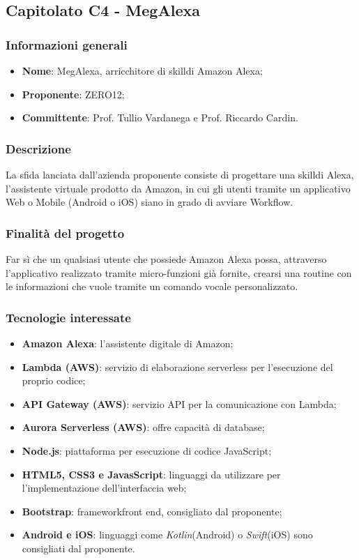 \subsection{Capitolato C4 - MegAlexa}
\subsubsection{Informazioni generali}
\begin{itemize}
	\item \textbf{Nome}: MegAlexa, arricchitore di skill\glosp di Amazon Alexa;
	\item \textbf{Proponente}: ZERO12;
	\item \textbf{Committente}: Prof. Tullio Vardanega e Prof. Riccardo Cardin.
\end{itemize}
\subsubsection{Descrizione}
La sfida lanciata dall’azienda proponente consiste di progettare una skill\glosp di Alexa, l’assistente virtuale prodotto da Amazon, in cui gli utenti tramite un applicativo Web o Mobile (Android o iOS) siano in grado di avviare Workflow\glo.
\subsubsection{Finalità del progetto}
Far sì che un qualsiasi utente che possiede Amazon Alexa possa, attraverso l’applicativo realizzato tramite micro-funzioni già fornite, crearsi una routine con le informazioni che vuole tramite un comando vocale personalizzato.
\subsubsection{Tecnologie interessate}
\begin{itemize}
	\item \textbf{Amazon Alexa}: l'assistente digitale di Amazon;
	\item \textbf{Lambda (AWS\glo)}: servizio di elaborazione serverless per l'esecuzione del proprio codice; 
	\item \textbf{API Gateway (AWS)}: servizio API per la comunicazione con Lambda;
	\item \textbf{Aurora Serverless (AWS)}: offre capacità di database;
	\item \textbf{Node.js\glo}: piattaforma per esecuzione di codice JavaScript;
	\item \textbf{HTML5, CSS3 e JavasScript}: linguaggi da utilizzare per l'implementazione dell'interfaccia web;
	\item \textbf{Bootstrap\glo}: framework\glosp front end, consigliato dal proponente;
	\item \textbf{Android e iOS}: linguaggi come \textit{Kotlin\glosp}(Android) o \textit{Swift\glosp}(iOS) sono consigliati dal proponente.
\end{itemize}
